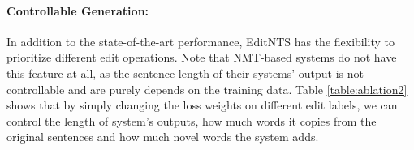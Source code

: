 \documentclass[11pt,a4paper]{article}
\def\add{{\texttt{ADD}}}
\def\deletes{{\texttt{DELETE} }}
\def\keep{{\texttt{KEEP}}}
\def\editnet{EditNTS}
\begin{document}
\paragraph{Controllable Generation:}
In addition to the state-of-the-art performance, \editnet{} has the flexibility to prioritize different edit operations.  Note that NMT-based systems do not have this feature at all, as the sentence length of their systems' output is not controllable and are purely depends on the training data.  Table \ref{table:ablation2} shows that by simply changing the loss weights on different edit labels, we can control the length of system's outputs, how much words it copies from the original sentences and how much novel words the system adds.  
\begin{table}[h]
\caption{Results on Newsela by controlling the edit label ratios. We increase the loss weight on \add,\keep,\deletes ten times respectively. The three rows show the systems' output statistics  on the average output sentence length (Avg. len), the average percentage of tokens that are copied from the input (\% copied), and the average percentage of novel tokens that are added with respect to the input sentence (\% novel).  }
\label{table:ablation2}
\end{table} 
\end{document}
